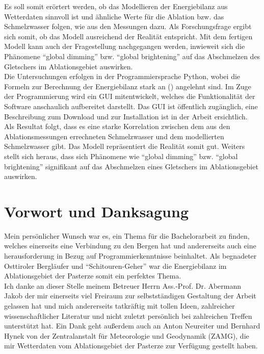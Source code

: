 \documentclass[11pt,a4paper]{article}
\begin{document}
Es soll somit erörtert werden, ob das Modellieren der Energiebilanz aus Wetterdaten sinnvoll ist und ähnliche Werte für die Ablation bzw. das Schmelzwasser folgen, wie aus den Messungen dazu. Als Forschungsfrage ergibt sich somit, ob das Modell ausreichend der Realität entspricht. Mit dem fertigen Modell kann auch der Fragestellung nachgegangen werden, inwieweit sich die Phänomene ``global dimming'' bzw. ``global brightening'' auf das Abschmelzen des Gletschers im Ablationsgebiet auswirken.\\

Die Untersuchungen erfolgen in der Programmiersprache Python, wobei die Formeln zur Berechnung der Energiebilanz stark an \citeauthor{ThePhysicsOfGlaciers} (\citeyear[153-157]{ThePhysicsOfGlaciers}) angelehnt sind. Im Zuge der Programmierung wird ein GUI mitentwickelt, welches die Funktionalität der Software anschaulich aufbereitet darstellt. Das GUI ist öffentlich zugänglich, eine Beschreibung zum Download und zur Installation ist in der Arbeit ersichtlich.\\

Als Resultat folgt, dass es eine starke Korrelation zwischen dem aus den Ablationsmessungen errechneten Schmelzwasser und dem modellierten Schmelzwasser gibt. Das Modell repräsentiert die Realität somit gut. Weiters stellt sich heraus, dass sich Phänomene wie ``global dimming'' bzw. ``global brightening'' signifikant auf das Abschmelzen eines Gletschers im Ablationsgebiet auswirken.\\


\pagebreak
\section*{Vorwort und Danksagung}
Mein persönlicher Wunsch war es, ein Thema für die Bachelorarbeit zu finden, welches einerseits eine Verbindung zu den Bergen hat und andererseits auch eine herausforderung in Bezug auf Programmierkenntnisse beinhaltet. Als begnadeter Osttiroler Bergläufer und ``Schitouren-Geher'' war die Energiebilanz im Ablationsgebiet der Pasterze somit ein perfektes Thema.\\

Ich danke an dieser Stelle meinem Betreuer Herrn Ass.-Prof. Dr. Abermann Jakob der mir einerseits viel Freiraum zur selbstständigen Gestaltung der Arbeit gelassen hat und mich andererseits tatkräftig mit tollen Ideen, zahlreicher wissenschaftlicher Literatur und nicht zuletzt persönlich bei zahlreichen Treffen unterstützt hat. Ein Dank geht außerdem auch an Anton Neureiter und Bernhard Hynek von der Zentralanstalt für Meteorologie und Geodynamik (ZAMG), die mir Wetterdaten vom Ablationsgebiet der Pasterze zur Verfügung gestellt haben.\\
\end{document}
